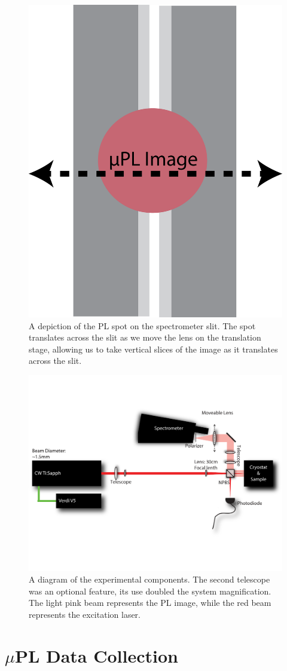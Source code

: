 \newpage 
\begin{figure}[h!]
\centering
\includegraphics[width = .25\textwidth]{SpecSlit.png}
\caption{ \doublespacing A depiction of the PL spot on the spectrometer slit. The spot translates across the slit as we move the lens on the translation stage, allowing us to take vertical slices of the image as it translates across the slit.}
\label{slit}
\end{figure}
\begin{figure}[h!]
\centering
\includegraphics[width = .75\textwidth]{upl.pdf}
\caption{ \doublespacing A diagram of the experimental components. The second telescope was an optional feature, its use doubled the system magnification. The light pink beam represents the PL image, while the red beam represents the excitation laser.}
\label{upl}
\end{figure}



\newpage
\section{$\mu$PL Data Collection}
